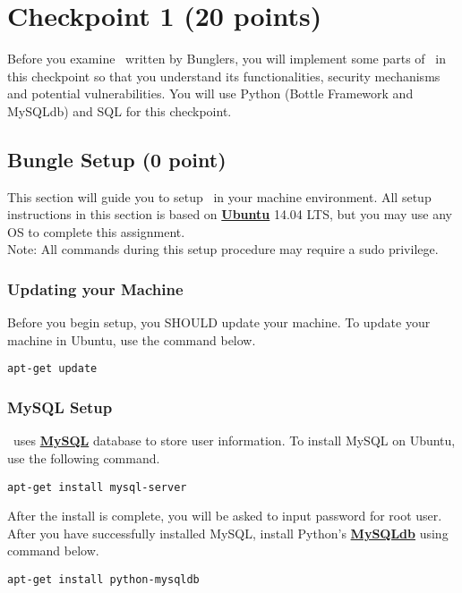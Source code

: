 \documentclass[letterpaper,12pt]{report}
\begin{document}
\newpage

\section{Checkpoint 1 (20 points)}
\label{sec:checkpoint_1}
Before you examine \bungle\ written by Bunglers, you will implement some parts of \bungle\ in this checkpoint so that you understand its functionalities, security mechanisms and potential vulnerabilities. You will use Python (Bottle Framework and MySQLdb) and SQL for this checkpoint.


\subsection{Bungle Setup (0 point)}
\label{sec:bungle_setup}
This section will guide you to setup \bungle\ in your machine environment. All setup instructions in this section is based on \href{http://www.ubuntu.com/download/desktop}{\textbf{Ubuntu}} 14.04 LTS, but you may use any OS to complete this assignment.\\
Note: All commands during this setup procedure may require a sudo privilege.

\subsubsection{Updating your Machine}
\label{sec:update_setup}
Before you begin setup, you SHOULD update your machine. To update your machine in Ubuntu, use the command below.
\begin{mdframed}
\begin{Verbatim}
apt-get update
\end{Verbatim}
\end{mdframed}

\subsubsection{MySQL Setup}
\label{sec:mysql_setup}
\bungle\ uses \href{http://www.mysql.com/downloads/}{\textbf{MySQL}} database to store user information. To install MySQL on Ubuntu, use the following command.
\begin{mdframed}
\begin{Verbatim}
apt-get install mysql-server
\end{Verbatim}
\end{mdframed}
After the install is complete, you will be asked to input password for root user. After you have successfully installed MySQL, install Python's \href{http://mysql-python.sourceforge.net/MySQLdb.html}{\textbf{MySQLdb}} using command below.
\begin{mdframed}
\begin{Verbatim}
apt-get install python-mysqldb
\end{Verbatim}
\end{mdframed}
\end{document}
